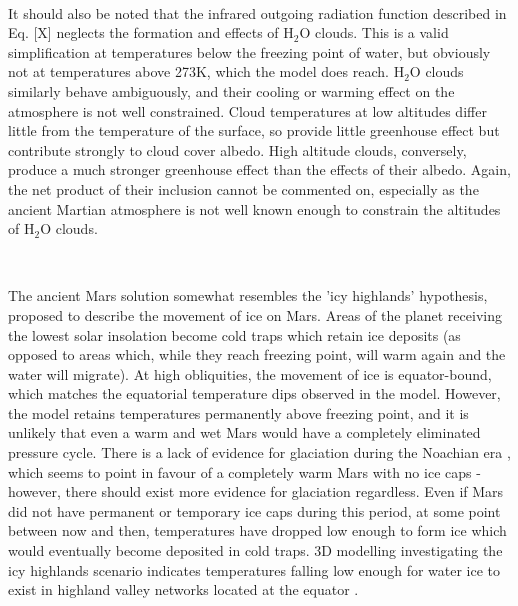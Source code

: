 \documentclass[12pt,onecolumn]{revtex4-2}    %
\begin{document}
\

It should also be noted that the infrared outgoing radiation function described in Eq. [X] neglects the formation and effects of $\mathrm{H_2 O}$ clouds. This is a valid simplification at temperatures below the freezing point of water, but obviously not at temperatures above 273K, which the model does reach. $\mathrm{H_2 O}$ clouds similarly behave ambiguously, and their cooling or warming effect on the atmosphere is not well constrained. Cloud temperatures at low altitudes differ little from the temperature of the surface, so provide little greenhouse effect but contribute strongly to cloud cover albedo. High altitude clouds, conversely, produce a much stronger greenhouse effect than the effects of their albedo. Again, the net product of their inclusion cannot be commented on, especially as the ancient Martian atmosphere is not well known enough to constrain the altitudes of $\mathrm{H_2 O}$ clouds.

\

The ancient Mars solution somewhat resembles the 'icy highlands' hypothesis, proposed to describe the movement of ice on Mars. Areas of the planet receiving the lowest solar insolation become cold traps which retain ice deposits (as opposed to areas which, while they reach freezing point, will warm again and the water will migrate). At high obliquities, the movement of ice is equator-bound, which matches the equatorial temperature dips observed in the model. However, the model retains temperatures permanently above freezing point, and it is unlikely that even a warm and wet Mars would have a completely eliminated pressure cycle. There is a lack of evidence for glaciation during the Noachian era \cite{W16}, which seems to point in favour of a completely warm Mars with no ice caps - however, there should exist more evidence for glaciation regardless. Even if Mars did not have permanent or temporary ice caps during this period, at some point between now and then, temperatures have dropped low enough to form ice which would eventually become deposited in cold traps. 3D modelling investigating the icy highlands scenario indicates temperatures falling low enough for water ice to exist in highland valley networks located at the equator \cite{W12}.

\
\end{document}
